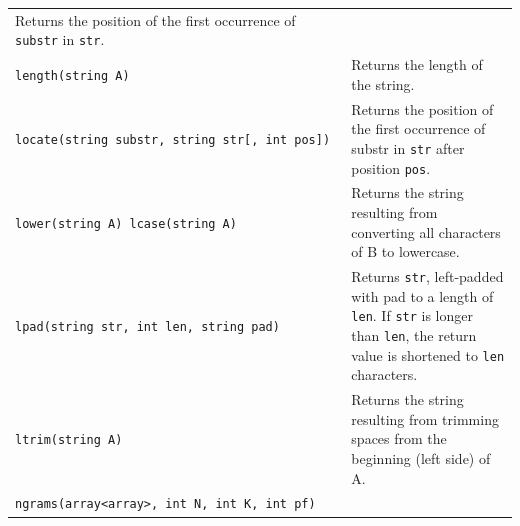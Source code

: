 \documentclass[
]{article}
\begin{document}
\begin{longtable}[]{@{}ll@{}}
\begin{minipage}[t]{0.55\columnwidth}
Returns the position of the first occurrence of \texttt{substr} in
\texttt{str}.\strut
\end{minipage}\tabularnewline
\begin{minipage}[t]{0.39\columnwidth}\raggedright
\texttt{length(string\ A)}\strut
\end{minipage} & \begin{minipage}[t]{0.55\columnwidth}\raggedright
Returns the length of the string.\strut
\end{minipage}\tabularnewline
\begin{minipage}[t]{0.39\columnwidth}\raggedright
\texttt{locate(string\ substr,\ string\ str{[},\ int\ pos{]})}\strut
\end{minipage} & \begin{minipage}[t]{0.55\columnwidth}\raggedright
Returns the position of the first occurrence of substr in \texttt{str}
after position \texttt{pos}.\strut
\end{minipage}\tabularnewline
\begin{minipage}[t]{0.39\columnwidth}\raggedright
\texttt{lower(string\ A)\ lcase(string\ A)}\strut
\end{minipage} & \begin{minipage}[t]{0.55\columnwidth}\raggedright
Returns the string resulting from converting all characters of B to
lowercase.\strut
\end{minipage}\tabularnewline
\begin{minipage}[t]{0.39\columnwidth}\raggedright
\texttt{lpad(string\ str,\ int\ len,\ string\ pad)}\strut
\end{minipage} & \begin{minipage}[t]{0.55\columnwidth}\raggedright
Returns \texttt{str}, left-padded with pad to a length of \texttt{len}.
If \texttt{str} is longer than \texttt{len}, the return value is
shortened to \texttt{len} characters.\strut
\end{minipage}\tabularnewline
\begin{minipage}[t]{0.39\columnwidth}\raggedright
\texttt{ltrim(string\ A)}\strut
\end{minipage} & \begin{minipage}[t]{0.55\columnwidth}\raggedright
Returns the string resulting from trimming spaces from the beginning
(left side) of A.\strut
\end{minipage}\tabularnewline
\begin{minipage}[t]{0.39\columnwidth}\raggedright
\texttt{ngrams(array\textless{}array\textgreater{},\ int\ N,\ int\ K,\ int\ pf)}\strut

\end{minipage}
\end{longtable}
\end{document}
